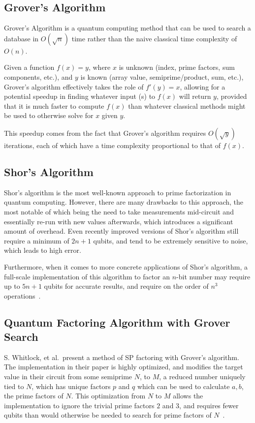 \documentclass[twocolumn]{cinc}
\begin{document}
  \subsection{Grover's Algorithm}

  Grover's Algorithm is a quantum computing method 
  that can be used to search a database in $O(\sqrt{n})$ time 
  rather than the naive classical time complexity of $O(n)$\cite{grover}. 
  
  Given a function $f(x)=y$, where $x$ is unknown (index, prime factors, 
  sum components, etc.), and $y$ is known (array value, semiprime/product, 
  sum, etc.), Grover's algorithm effectively takes the role of $f'(y)=x$, 
  allowing for a potential speedup in finding whatever input (s) to $f(x)$
  will return $y$, provided that it is much faster to compute $f(x)$ than
  whatever classical methods might be used to otherwise solve for $x$ given $y$.

  This speedup comes from the fact that Grover's algorithm requires 
  $O(\sqrt{y})$ iterations, each of which have a time complexity proportional
  to that of $f(x)$.

  \subsection{Shor's Algorithm}

  Shor's algorithm is the most well-known approach to prime factorization
  in quantum computing. However, there are many drawbacks to this approach,
  the most notable of which being the need to take measurements mid-circuit
  and essentially re-run with new values afterwards, which introduces a 
  significant amount of overhead. Even recently improved versions of Shor's
  algorithm still require a minimum of $2n+1$ qubits, and tend to be 
  extremely sensitive to noise, which leads to high error\cite{quantum_factoring,shor}.

  Furthermore, when it comes to more concrete applications of Shor's algorithm,
  a full-scale implementation of this algorithm to factor an $n$-bit number
  may require up to $5n+1$ qubits for accurate results, and require 
  on the order of $n^3$ operations~\cite{quantum_fac_efficient}.

  \subsection{Quantum Factoring Algorithm with Grover Search}

  S. Whitlock, et al.\ present a method of SP factoring with Grover's
  algorithm. The implementation in their paper is highly optimized,
  and modifies the target value in their circuit from some semiprime $N$,
  to $M$, a reduced number uniquely tied to $N$, which has unique factors 
  $p$ and $q$ which can be used to calculate $a, b$, the prime factors of 
  $N$. This optimization from $N$ to $M$ allows the implementation to ignore
  the trivial prime factors $2$ and $3$, and requires fewer qubits than would
  otherwise be needed to search for prime factors of $N$~\cite{quantum_factoring}.
\end{document}
